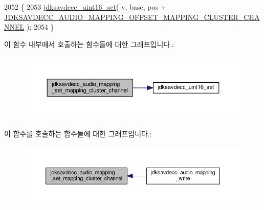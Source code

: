 \begin{DoxyCode}
2052 \{
2053     \hyperlink{group__endian_ga14b9eeadc05f94334096c127c955a60b}{jdksavdecc\_uint16\_set}( v, base, pos + 
      \hyperlink{group__audio__mapping_ga625a930d4963bce1d448347efdd150ce}{JDKSAVDECC\_AUDIO\_MAPPING\_OFFSET\_MAPPING\_CLUSTER\_CHANNEL}
       );
2054 \}
\end{DoxyCode}


이 함수 내부에서 호출하는 함수들에 대한 그래프입니다.\+:
\nopagebreak
\begin{figure}[H]
\begin{center}
\leavevmode
\includegraphics[width=350pt]{group__audio__mapping_gaa9de5841a8f388d0ee56824fd906700d_cgraph}
\end{center}
\end{figure}




이 함수를 호출하는 함수들에 대한 그래프입니다.\+:
\nopagebreak
\begin{figure}[H]
\begin{center}
\leavevmode
\includegraphics[width=350pt]{group__audio__mapping_gaa9de5841a8f388d0ee56824fd906700d_icgraph}
\end{center}
\end{figure}


